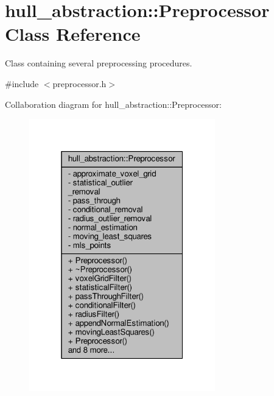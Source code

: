 \hypertarget{classhull__abstraction_1_1_preprocessor}{}\section{hull\+\_\+abstraction\+:\+:Preprocessor Class Reference}
\label{classhull__abstraction_1_1_preprocessor}


Class containing several preprocessing procedures.  




{\ttfamily \#include $<$preprocessor.\+h$>$}



Collaboration diagram for hull\+\_\+abstraction\+:\+:Preprocessor\+:\nopagebreak
\begin{figure}[H]
\begin{center}
\leavevmode
\includegraphics[width=229pt]{classhull__abstraction_1_1_preprocessor__coll__graph}
\end{center}
\end{figure}

